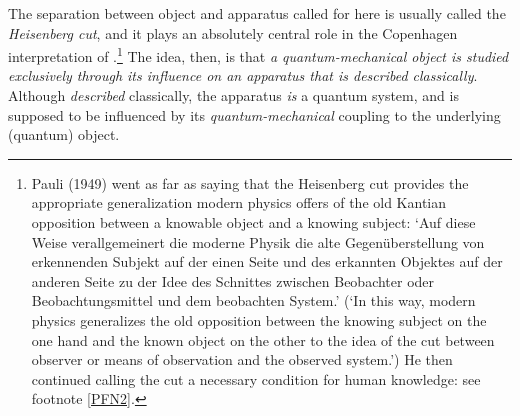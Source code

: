 \documentclass[12pt,titlepage]{article}
\begin{document}
The separation between object and apparatus called for here is
usually called the \textit{Heisenberg cut}, and it  plays an absolutely central role in the Copenhagen interpretation of \qm.\footnote{Pauli (1949) went  as far as saying that the Heisenberg cut provides the appropriate generalization modern physics offers of the old Kantian opposition between a knowable object and a knowing subject: `Auf diese Weise verallgemeinert die moderne Physik die alte Gegen\"{u}berstellung von erkennenden Subjekt auf der einen Seite und des erkannten Objektes auf der anderen Seite zu der Idee des Schnittes zwischen Beobachter oder Beobachtungsmittel und dem beobachten System.'
(`In this way, modern physics generalizes the old opposition between the knowing subject on the one hand and the known object on the other to the idea
of the cut between observer or means of observation and the observed system.')  He then continued  calling the cut a necessary condition for human knowledge: see footnote \ref{PFN2}. } 
The idea, then, is that {\it a quantum-mechanical object is studied exclusively through its influence on an apparatus that is described classically}. Although {\it described} classically, the apparatus {\it is} a quantum system, and is supposed to be  influenced by its {\it quantum-mechanical} coupling to the underlying (quantum) object.
\end{document}
